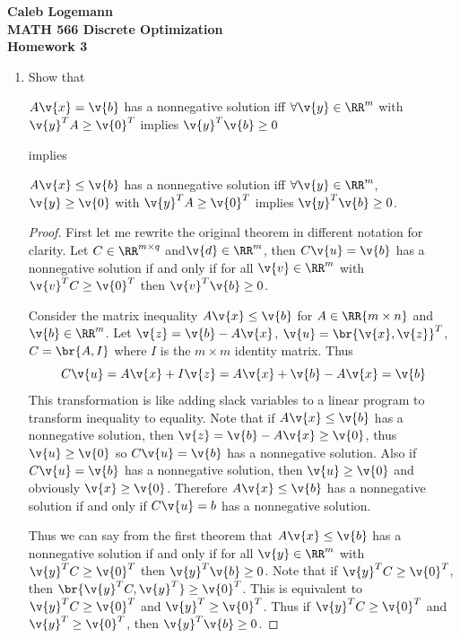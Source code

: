 \documentclass[11pt, oneside]{article}
\begin{document}
\noindent \textbf{\Large{Caleb Logemann \\
MATH 566 Discrete Optimization\\
Homework 3
}}

%
\begin{enumerate}
    \item %
        Show that
        \begin{center}
            $A\v{x} = \v{b}$ has a nonnegative solution iff
            $\forall \v{y} \in \RR^m$ with $\v{y}^T A \ge \v{0}^T$ implies
            $\v{y}^T \v{b} \ge 0$
        \end{center}
        implies
        \begin{center}
            $A\v{x} \le \v{b}$ has a nonnegative solution iff
            $\forall \v{y} \in \RR^m$, $\v{y} \ge \v{0}$ with $\v{y}^T A \ge \v{0}^T$
            implies $\v{y}^T \v{b} \ge 0$.
        \end{center}

        \begin{proof}
            First let me rewrite the original theorem in different notation for
            clarity.
            Let $C \in \RR^{m \times q}$ and$\v{d} \in \RR^m$, then
            $C\v{u} = \v{b}$ has a nonnegative solution if and only if for all
            $\v{v} \in \RR^m$ with $\v{v}^T C \ge \v{0}^T$ then
            $\v{v}^T \v{b} \ge 0$.

            Consider the matrix inequality $A\v{x} \le \v{b}$ for
            $A \in \RR{m \times n}$ and $\v{b} \in \RR^m$.
            Let $\v{z} = \v{b} - A\v{x}$, $\v{u} = \br{\v{x}, \v{z}}^T$,
            $C = \br{A, I}$ where $I$ is the $m \times m$ identity matrix.
            Thus
            \[
                C\v{u} = A\v{x} + I \v{z} = A\v{x} + \v{b} - A \v{x} = \v{b}
            \]
            This transformation is like adding slack variables to a linear
            program to transform inequality to equality.
            Note that if $A\v{x} \le \v{b}$ has a nonnegative solution, then
            $\v{z} = \v{b} - A\v{x} \ge \v{0}$, thus $\v{u} \ge \v{0}$ so
            $C\v{u} = \v{b}$ has a nonnegative solution. 
            Also if $C\v{u} = \v{b}$ has a nonnegative solution, then
            $\v{u} \ge \v{0}$ and obviously $\v{x} \ge \v{0}$.
            Therefore $A\v{x} \le \v{b}$ has a nonnegative solution if and only
            if $C\v{u} = b$ has a nonnegative solution.

            Thus we can say from the first theorem that $A\v{x} \le \v{b}$ has
            a nonnegative solution if and only if for all $\v{y} \in \RR^m$
            with $\v{y}^T C \ge \v{0}^T$ then $\v{y}^T \v{b} \ge 0$.
            Note that if $\v{y}^T C \ge \v{0}^T$, then
            $\br{\v{y}^T C, \v{y}^T} \ge \v{0}^T$.
            This is equivalent to $\v{y}^T C \ge \v{0}^T$ and $\v{y}^T \ge \v{0}^T$.
            Thus if $\v{y}^T C \ge \v{0}^T$ and $\v{y}^T \ge \v{0}^T$, then
            $\v{y}^T \v{b} \ge 0$.


\end{proof}
\end{enumerate}
\end{document}
